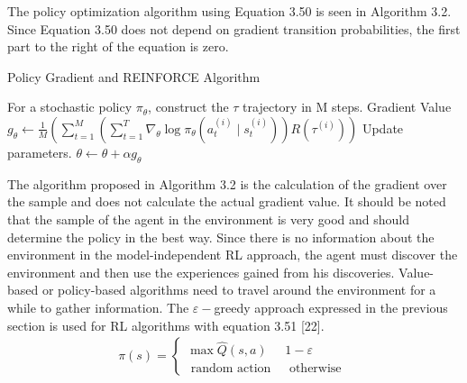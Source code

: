 \documentclass[12pt,twoside,a4]{mwbk}
\begin{document}
The policy optimization algorithm using Equation 3.50 is seen in Algorithm 3.2. Since Equation 3.50 does not depend on gradient transition probabilities, the first part to the right of the equation is zero.
\begin{algorithm}
\caption{Policy Gradient and REINFORCE Algorithm}
\begin{algorithmic}[1]
\State For a stochastic policy $\pi _{\theta}$, construct the $\tau$ trajectory in M steps.
\State Gradient Value $g_{\theta }\leftarrow\frac{1}{M} \left ( \sum_{t=1}^{M}\left ( \sum_{t=1}^{T} \nabla_{\theta} \log \pi_{\theta}\left(a_{t}^{(i)} \mid s_{t}^{(i)}\right) \right ) R(\tau ^{(i)}) \right )$
\State Update parameters. $\theta\leftarrow \theta + \alpha g_{\theta }$
\end{algorithmic}
\end{algorithm}

\noindent The algorithm proposed in Algorithm 3.2 is the calculation of the gradient over the sample and does not calculate the actual gradient value. It should be noted that the sample of the agent in the environment is very good and should determine the policy in the best way. Since there is no information about the environment in the model-independent RL approach, the agent must discover the environment and then use the experiences gained from his discoveries. Value-based or policy-based algorithms need to travel around the environment for a while to gather information. The $\varepsilon-$greedy approach expressed in the previous section is used for RL algorithms with equation 3.51 [22].
\begin{subequations}
\begin{align}
   \pi(s)=\left\{\begin{array}{cc}
\max \hat{Q}(s, a) & 1-\varepsilon \\
\text { random action } & \text { otherwise }
\end{array}\right.
\end{align}
\end{subequations}
\end{document}
